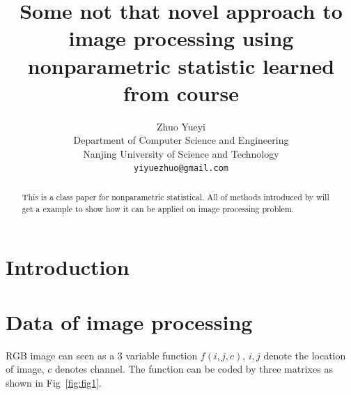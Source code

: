 \documentclass{article}
\title{Some not that novel approach to image processing using nonparametric statistic learned from course}
\author{
  Zhuo Yueyi \\ %
  Department of Computer Science and Engineering\\
  Nanjing University of Science and Technology\\
  \texttt{yiyuezhuo@gmail.com} \\
}
\begin{document}
\maketitle

\begin{abstract}
This is a class paper for nonparametric statistical. 
All of methods introduced by \cite{wasserman2006all} will get a example to show how it can be applied on
image processing problem.
\end{abstract}




\section{Introduction}




\section{Data of image processing}

RGB image can seen as a 3 variable function $f(i,j,c)$, $i,j$ denote the location of image, $c$ denotes
channel. The function can be coded by three matrixes as shown in Fig~\ref{fig:fig1}.
\end{document}
